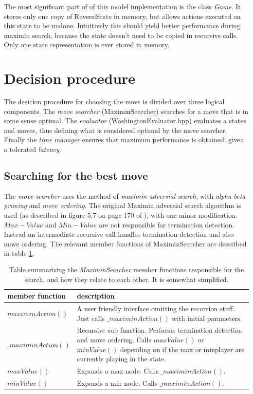 \documentclass[a4paper,11pt]{article}
\begin{document}
The most significant part of of this model implementation is the class \textit{Game}. It stores only one copy of ReversiState in memory, but allows actions executed on this state to be undone. Intuitively this should yield better performance during maximin search, because the state doesn't need to be copied in recursive calls. Only one state representation is ever stored in memory.

\section{Decision procedure}
The desicion procedure for choosing the move is divided over three logical components. The \textit{move searcher} (MaximinSearcher) searches for a move that is in some sense optimal. The \textit{evaluator} (WashingtonEvaluator.hpp) evaluates a states and moves, thus defining what is considered optimal by the move searcher. Finally the \textit{time manager} ensures that maximum performance is obtained, given a tolerated \textit{latency}.

\subsection{Searching for the best move}
The \textit{move searcher} uses the method of \textit{maximin adversial search}, with \textit{alpha-beta pruning} and \textit{move ordering}. The original Maximin adversial search algorithm is used (as described in figure 5.7 on page 170 of \cite{aibook}), with one minor modification. $Max-Value$ and $Min-Value$ are not responsible for termination detection. Instead an intermediate recursive call handles termination detection and also move ordering. The relevant member functions of MaximinSearcher are described in table \ref{tab:maximinfunc}.

\begin{table}

\centering
\begin{tabular}{|l|p{12 cm}|}
\hline
\textbf{member function} & \textbf{description}
\\\hline
$maximinAction()$ & A user friendly interface omitting the recursion stuff. Just calls $\_maximinAction()$ with initial parameters.
\\ \hline
$\_maximinAction()$ & Recursive sub function. Performs termination detection and move ordering. Calls $maxValue()$ or $minValue()$ depending on if the max or minplayer are currently playing in the state.
\\ \hline
$maxValue()$ & Expands a max node. Calls $\_maximinAction()$.
\\ \hline
$minValue()$ & Expands a min node. Calls $\_maximinAction()$.
\\ \hline
\end{tabular}

\caption{Table summarising the \emph{MaximinSearcher} member functions responsible for the search, and how they relate to each other. It is somewhat simplified.} \label{tab:maximinfunc}

\end{table}
\end{document}
